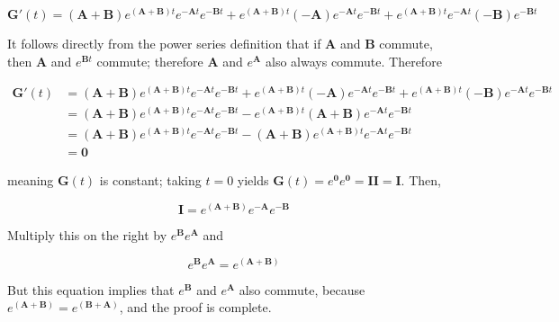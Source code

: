\begin{equation} \mathbf{G}'(t) = \left(\mathbf{A}+\mathbf{B}\right)e^{\left(\mathbf{A}+\mathbf{B}\right)t}e^{-\mathbf{A}t}e^{-\mathbf{B}t} + e^{\left(\mathbf{A}+\mathbf{B}\right)t}\left(-\mathbf{A}\right)e^{-\mathbf{A}t}e^{-\mathbf{B}t} + e^{\left(\mathbf{A}+\mathbf{B}\right)t}e^{-\mathbf{A}t}\left(-\mathbf{B}\right)e^{-\mathbf{B}t} \end{equation}

	It follows directly from the power series definition that if $\mathbf{A}$ and $\mathbf{B}$ commute, then $\mathbf{A}$ and $e^{\mathbf{B}t}$ commute; therefore $\mathbf{A}$ and $e^{\mathbf{A}}$ also always commute. Therefore

\begin{align}
	\mathbf{G}'(t) &= \left(\mathbf{A}+\mathbf{B}\right)e^{\left(\mathbf{A}+\mathbf{B}\right)t}e^{-\mathbf{A}t}e^{-\mathbf{B}t} + e^{\left(\mathbf{A}+\mathbf{B}\right)t}\left(-\mathbf{A}\right)e^{-\mathbf{A}t}e^{-\mathbf{B}t} + e^{\left(\mathbf{A}+\mathbf{B}\right)t}\left(-\mathbf{B}\right)e^{-\mathbf{A}t}e^{-\mathbf{B}t} \nonumber\\[5mm]
	&= \left(\mathbf{A}+\mathbf{B}\right)e^{\left(\mathbf{A}+\mathbf{B}\right)t}e^{-\mathbf{A}t}e^{-\mathbf{B}t} - e^{\left(\mathbf{A}+\mathbf{B}\right)t}\left(\mathbf{A+B}\right) e^{-\mathbf{A}t}e^{-\mathbf{B}t}\nonumber\\[5mm]
	&= \left(\mathbf{A}+\mathbf{B}\right)e^{\left(\mathbf{A}+\mathbf{B}\right)t}e^{-\mathbf{A}t}e^{-\mathbf{B}t} - \left(\mathbf{A+B}\right)e^{\left(\mathbf{A}+\mathbf{B}\right)t} e^{-\mathbf{A}t}e^{-\mathbf{B}t}\nonumber\\[5mm]
	&= \mathbf{0}
\end{align}

	meaning $\mathbf{G}(t)$ is constant; taking $t=0$ yields $\mathbf{G}(t) = e^{\mathbf{0}}e^{\mathbf{0}} = \mathbf{II} = \mathbf{I}$. Then,

\begin{equation} \mathbf{I} = e^{\left(\mathbf{A}+\mathbf{B}\right)}e^{-\mathbf{A}}e^{-\mathbf{B}} \end{equation}

	Multiply this on the right by $e^{\mathbf{B}}e^{\mathbf{A}}$ and 

\begin{equation} e^{\mathbf{B}}e^{\mathbf{A}} = e^{\left(\mathbf{A}+\mathbf{B}\right)} \end{equation}

	But this equation implies that $e^{\mathbf{B}}$ and $e^{\mathbf{A}}$ also commute, because $e^{\left(\mathbf{A}+\mathbf{B}\right)} = e^{\left(\mathbf{B}+\mathbf{A}\right)}$, and the proof is complete.

